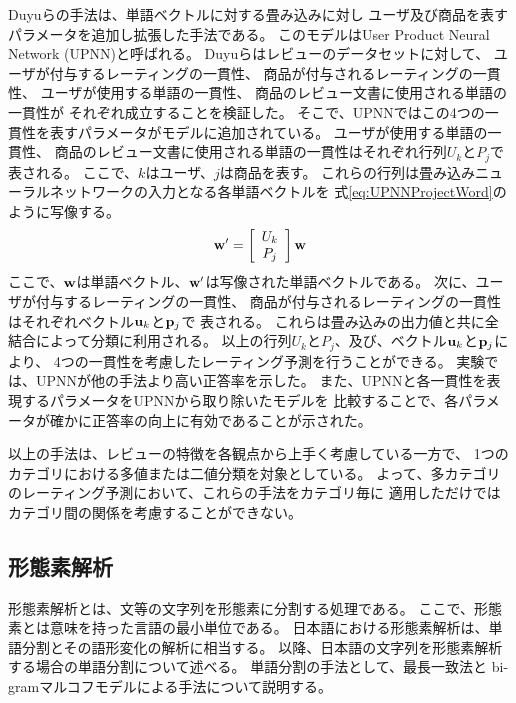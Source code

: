 Duyuらの手法は、単語ベクトルに対する畳み込み\nn に対し
ユーザ及び商品を表すパラメータを追加し拡張した手法である。
このモデルはUser Product Neural Network (UPNN)と呼ばれる。
Duyuらはレビューのデータセットに対して、
ユーザが付与するレーティングの一貫性、
商品が付与されるレーティングの一貫性、
ユーザが使用する単語の一貫性、
商品のレビュー文書に使用される単語の一貫性が
それぞれ成立することを検証した。
そこで、UPNNではこの4つの一貫性を表すパラメータがモデルに追加されている。
ユーザが使用する単語の一貫性、
商品のレビュー文書に使用される単語の一貫性はそれぞれ行列$U_k$と$P_j$で
表される。
ここで、$k$はユーザ、$j$は商品を表す。
これらの行列は畳み込みニューラルネットワークの入力となる各単語ベクトルを
式\ref{eq:UPNNProjectWord}のように写像する。
\begin{gather} \label{eq:UPNNProjectWord}
  \mathbf{w}' = \left[ \begin{array}{c} U_k \\ P_j \end{array} \right] \mathbf{w}
\end{gather}
ここで、$\mathbf{w}$は単語ベクトル、$\mathbf{w}'$は写像された単語ベクトルである。
次に、ユーザが付与するレーティングの一貫性、
商品が付与されるレーティングの一貫性はそれぞれベクトル$\mathbf{u}_k$と$\mathbf{p}_j$で
表される。
これらは畳み込み\nn の出力値と共に全結合\nn によって分類に利用される。
以上の行列$U_k$と$P_j$、及び、ベクトル$\mathbf{u}_k$と$\mathbf{p}_j$により、
4つの一貫性を考慮したレーティング予測を行うことができる。
実験では、UPNNが他の手法より高い正答率を示した。
また、UPNNと各一貫性を表現するパラメータをUPNNから取り除いたモデルを
比較することで、各パラメータが確かに正答率の向上に有効であることが示された。

以上の手法は、レビューの特徴を各観点から上手く考慮している一方で、
1つのカテゴリにおける多値または二値分類を対象としている。
よって、多カテゴリのレーティング予測において、これらの手法をカテゴリ毎に
適用しただけではカテゴリ間の関係を考慮することができない。


\subsection{形態素解析} \label{ssec:MorphologicalAnalysis}

形態素解析とは、文等の文字列を形態素に分割する処理である\cite{hozumi06}。
ここで、形態素とは意味を持った言語の最小単位である。
日本語における形態素解析は、単語分割とその語形変化の解析に相当する。
以降、日本語の文字列を形態素解析する場合の単語分割について述べる。
単語分割の手法として、最長一致法と
bi-gramマルコフモデルによる手法について説明する。


